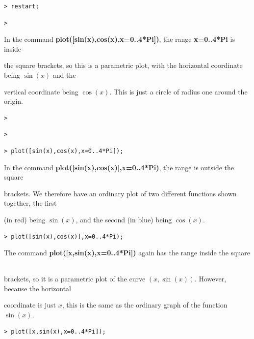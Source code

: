 \documentclass{article}
\begin{document}
\begin{lstlisting}
> restart;
\end{lstlisting}
\begin{lstlisting}
> 
\end{lstlisting}
\begin{Maple Normal}
In the command \textcolor[RGB]{255,0,0}{\textbf{plot([sin(x),cos(x),x=0..4*Pi])}}, the range\textcolor[RGB]{255,0,0}{\textbf{ x=0..4*Pi}} is inside\

the square brackets, so this is a parametric plot, with the horizontal coordinate being 
$ \sin (x) $ and the \

vertical coordinate being 
$ \cos (x) $.  This is just a circle of radius one around the origin.
\end{Maple Normal}
\begin{lstlisting}
> 
\end{lstlisting}
\begin{lstlisting}
> 
\end{lstlisting}
\begin{lstlisting}
> plot([sin(x),cos(x),x=0..4*Pi]);

\end{lstlisting}
\begin{Maple Normal}
In the command \textcolor[RGB]{255,0,0}{\textbf{plot([sin(x),cos(x)],x=0..4*Pi)}}, the range is outside the square\

brackets.  We therefore have an ordinary plot of two different functions shown together, the first\

(in red) being 
$ \sin (x) $, and the second (in blue) being 
$ \cos (x) $.\


\end{Maple Normal}
\begin{lstlisting}
> plot([sin(x),cos(x)],x=0..4*Pi);

\end{lstlisting}
\begin{Maple Normal}
The command \textcolor[RGB]{255,0,0}{\textbf{plot([x,sin(x),x=0..4*Pi])}} again has the range inside the square \

brackets, so it is a parametric plot of the curve 
$ (x ,\sin (x)) $.  However, because the horizontal\

coordinate is just 
$ x  $, this is the same as the ordinary graph of the function 
$ \sin (x) $.
\end{Maple Normal}
\begin{lstlisting}
> plot([x,sin(x),x=0..4*Pi]);
\end{lstlisting}
\end{document}
